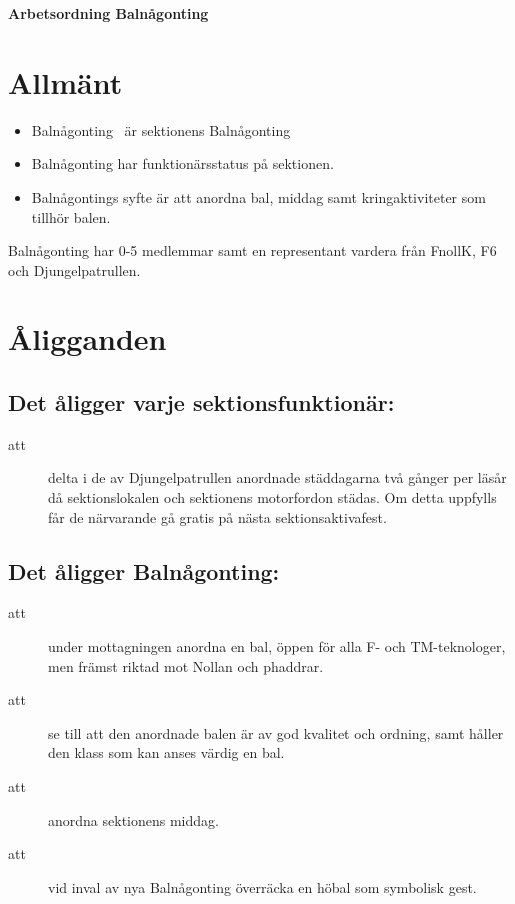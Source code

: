 \renewcommand{\dateseparator}{-} %

\renewcommand{\forening}{Balnågonting }

\begin{center}
\LARGE{\textbf{Arbetsordning \forening}}
\end{center}




\section{Allmänt}
\begin{itemize}
\item \forening \ är sektionens Balnågonting
\item Balnågonting har funktionärsstatus på sektionen. 
\item Balnågontings syfte är att anordna bal, middag samt kringaktiviteter som tillhör balen.
\end{itemize}


Balnågonting har 0-5 medlemmar samt en representant vardera från FnollK, F6 och Djungelpatrullen.


\section{Åligganden}
\subsection{Det åligger varje sektionsfunktionär:}
    \begin{description}
      \item[att] delta i de av Djungelpatrullen anordnade städdagarna två gånger per
      läsår då sektionslokalen och sektionens motorfordon städas. Om detta uppfylls får de närvarande gå gratis på nästa
      sektionsaktivafest.
    \end{description}
\subsection{Det åligger Balnågonting:}
		\begin{description}
\item[att] under mottagningen anordna en
  			bal, öppen för alla F- och \-TM-tekno\-log\-er, men främst riktad mot Nollan och phaddrar.
  		\item[att] se till att den anordnade balen är av god kvalitet och ordning, 
  			samt håller den klass som kan anses värdig en bal.
		\item[att] anordna sektionens middag.
		\item[att] vid inval av nya Balnågonting överräcka en höbal som symbolisk gest.
  	\end{description}


